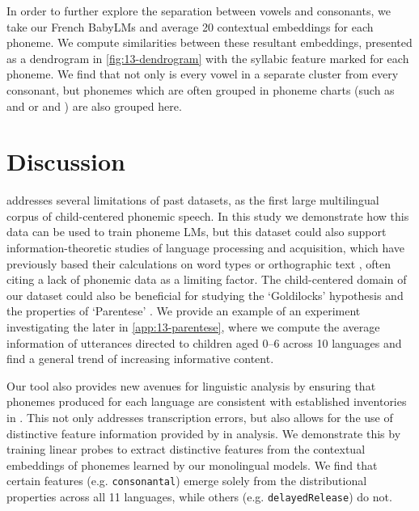 
In order to further explore the separation between vowels and consonants, we take our French BabyLMs and average 20 contextual embeddings for each phoneme. We compute similarities between these resultant embeddings, presented as a dendrogram in \cref{fig:13-dendrogram} with the syllabic feature marked for each phoneme. We find that not only is every vowel in a separate cluster from every consonant, but phonemes which are often grouped in phoneme charts (such as  and  or  and \ttipa{\textschwa}) are also grouped here.

\section{Discussion}

\ipachildes addresses several limitations of past datasets, as the first large multilingual corpus of child-centered phonemic speech. In this study we demonstrate how this data can be used to train phoneme LMs, but this dataset could also support information-theoretic studies of language processing and acquisition, which have previously based their calculations on word types \citep{piantadosi2011word, dautriche2017words, pimentel2020phonotactic} or orthographic text \citep{mahowald2013info, dautriche2017wordform, futrell2020lossy}, often citing a lack of phonemic data as a limiting factor. %
The child-centered domain of our dataset could also be beneficial for studying the `Goldilocks' hypothesis \citep{kidd2014goldilocks} and the properties of `Parentese' \citep{ramirez2017look}. We provide an example of an experiment investigating the later in \cref{app:13-parentese}, where we compute the average information of utterances directed to children aged 0--6 across 10 languages and find a general trend of increasing informative content.

Our \gpp tool also provides new avenues for linguistic analysis by ensuring that phonemes produced for each language are consistent with established inventories in \phoible. This not only addresses transcription errors, but also allows for the use of distinctive feature information provided by \phoible in analysis. We demonstrate this by training linear probes to extract distinctive features from the contextual embeddings of phonemes learned by our monolingual models. We find that certain features (e.g. \texttt{consonantal}) emerge solely from the distributional properties across all 11 languages, while others (e.g. \texttt{delayedRelease}) do not. 

